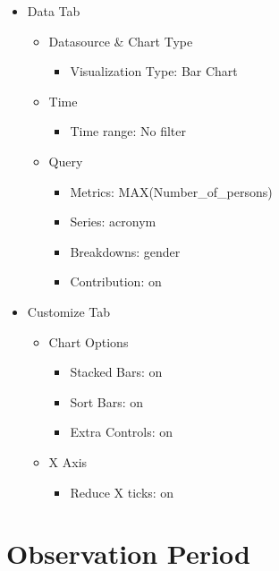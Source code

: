 \documentclass[
]{book}
\providecommand{\tightlist}{%
  \setlength{\itemsep}{0pt}\setlength{\parskip}{0pt}}
\begin{document}
\begin{itemize}
\tightlist
\item
  Data Tab

  \begin{itemize}
  \tightlist
  \item
    Datasource \& Chart Type

    \begin{itemize}
    \tightlist
    \item
      Visualization Type: Bar Chart
    \end{itemize}
  \item
    Time

    \begin{itemize}
    \tightlist
    \item
      Time range: No filter
    \end{itemize}
  \item
    Query

    \begin{itemize}
    \tightlist
    \item
      Metrics: MAX(Number\_of\_persons)
    \item
      Series: acronym
    \item
      Breakdowns: gender
    \item
      Contribution: on
    \end{itemize}
  \end{itemize}
\item
  Customize Tab

  \begin{itemize}
  \tightlist
  \item
    Chart Options

    \begin{itemize}
    \tightlist
    \item
      Stacked Bars: on
    \item
      Sort Bars: on
    \item
      Extra Controls: on
    \end{itemize}
  \item
    X Axis

    \begin{itemize}
    \tightlist
    \item
      Reduce X ticks: on
    \end{itemize}
  \end{itemize}
\end{itemize}

\hypertarget{observation-period}{%
\section{Observation Period}\label{observation-period}}
\end{document}
